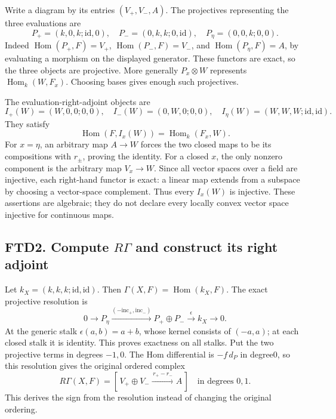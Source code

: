 Write a diagram by its entries \((V_+,V_-,A)\). The projectives
representing the three evaluations are \[
P_+=(k,0,k;\mathrm{id},0),\quad
P_-=(0,k,k;0,\mathrm{id}),\quad
P_\eta=(0,0,k;0,0).
\tag{FTD1.2}
\] Indeed \(\operatorname{Hom}(P_+,F)=V_+\),
\(\operatorname{Hom}(P_-,F)=V_-\), and
\(\operatorname{Hom}(P_\eta,F)=A\), by evaluating a morphism on the
displayed generator. These functors are exact, so the three objects are
projective. More generally \(P_x\otimes W\) represents
\(\operatorname{Hom}_k(W,F_x)\). Choosing bases gives enough such
projectives.

The evaluation-right-adjoint objects are \[
I_+(W)=(W,0,0;0,0),\quad
I_-(W)=(0,W,0;0,0),\quad
I_\eta(W)=(W,W,W;\mathrm{id},\mathrm{id}).
\tag{FTD1.3}
\] They satisfy \[
\operatorname{Hom}(F,I_x(W))=\operatorname{Hom}_k(F_x,W).
\tag{FTD1.4}
\] For \(x=\eta\), an arbitrary map \(A\to W\) forces the two closed
maps to be its compositions with \(r_\pm\), proving the identity. For a
closed \(x\), the only nonzero component is the arbitrary map
\(V_x\to W\). Since all vector spaces over a field are injective, each
right-hand functor is exact: a linear map extends from a subspace by
choosing a vector-space complement. Thus every \(I_x(W)\) is injective.
These assertions are algebraic; they do not declare every locally convex
vector space injective for continuous maps.

\subsection{\texorpdfstring{FTD2. Compute \(R\Gamma\) and construct its
right
adjoint}{FTD2. Compute R\textbackslash Gamma and construct its right adjoint}}\label{ftd2.-compute-rgamma-and-construct-its-right-adjoint}

Let \(k_X=(k,k,k;\mathrm{id},\mathrm{id})\). Then
\(\Gamma(X,F)=\operatorname{Hom}(k_X,F)\). The exact projective
resolution is \[
0\to P_\eta
\xrightarrow{(-\mathrm{inc}_+,\mathrm{inc}_-)}
P_+\oplus P_-
\xrightarrow{\epsilon}k_X\to0.
\tag{FTD2.1}
\] At the generic stalk \(\epsilon(a,b)=a+b\), whose kernel consists of
\((-a,a)\); at each closed stalk it is identity. This proves exactness
on all stalks. Put the two projective terms in degrees \(-1,0\). The Hom
differential is \(-f\,d_P\) in degree0, so this resolution gives the
original ordered complex \[
R\Gamma(X,F)=
[\,V_+\oplus V_-\xrightarrow{\,r_+-r_-\,}A\,]
\quad\text{in degrees }0,1.
\tag{FTD2.2}
\] This derives the sign from the resolution instead of changing the
original ordering.

